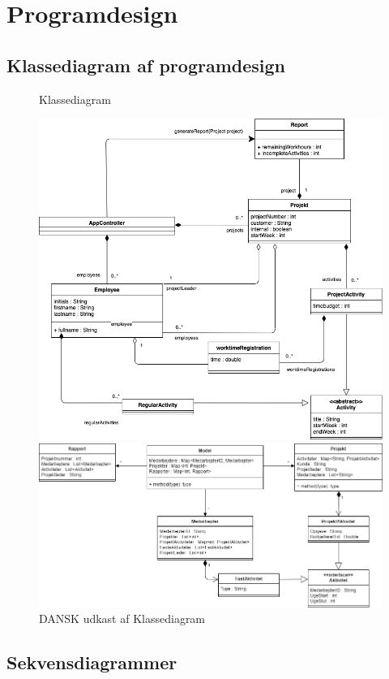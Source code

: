 \section{Programdesign}
\subsection{Klassediagram af programdesign}
\begin{figure}[H]
    \centering
    \caption{Klassediagram}\label{fig:ClassDiag}
    \includegraphics[width = .75\textwidth]{Diagrams/Klassediagram_eng.png}

    \caption{DANSK udkast af Klassediagram}\label{fig:ClassDiag}
    \includegraphics[width = .75\textwidth]{Diagrams/Klassediagram.png}
\end{figure}
\subsection{Sekvensdiagrammer}
